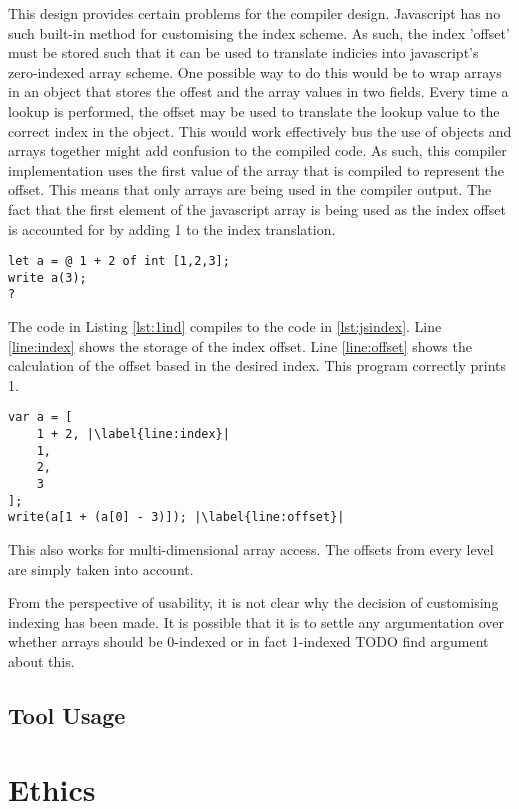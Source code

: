 \documentclass{article}
\begin{document}
This design provides certain problems for the compiler design. Javascript has no such built-in method for customising the index scheme. As such, the index 'offset' must be stored such that it can be used to translate indicies into javascript's zero-indexed array scheme. One possible way to do this would be to wrap arrays in an object that stores the offest and the array values in two fields. Every time a lookup is performed, the offset may be used to translate the lookup value to the correct index in the object. This would work effectively bus the use of objects and arrays together might add confusion to the compiled code. As such, this compiler implementation uses the first value of the array that is compiled to represent the offset. This means that only arrays are being used in the compiler output. The fact that the first element of the javascript array is being used as the index offset is accounted for by adding 1 to the index translation.

\begin{lstlisting}[caption={1-Indexed Array},label={lst:1ind}, escapechar="|"]
let a = @ 1 + 2 of int [1,2,3];
write a(3);
?
\end{lstlisting}

The code in Listing \ref{lst:1ind} compiles to the code in \ref{lst:jsindex}. Line \ref{line:index} shows the storage of the index offset. Line \ref{line:offset} shows the calculation of the offset based in the desired index. This program correctly prints 1.

\begin{lstlisting}[caption={TODO},label={lst:jsindex}, escapechar="|"]
var a = [
    1 + 2, |\label{line:index}|
    1,
    2,
    3
];
write(a[1 + (a[0] - 3)]); |\label{line:offset}|
\end{lstlisting}

This also works for multi-dimensional array access. The offsets from every level are simply taken into account.

From the perspective of usability, it is not clear why the decision of customising indexing has been made. It is possible that it is to settle any argumentation over whether arrays should be 0-indexed or in fact 1-indexed TODO find argument about this.

\subsection{Tool Usage}

\section{Ethics}
 
\end{document}

